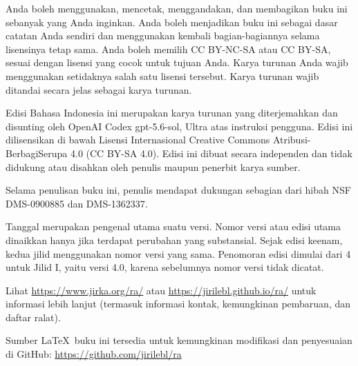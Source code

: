 \documentclass[12pt]{book}
\theoremstyle{plain}
\theoremstyle{remark}
\theoremstyle{definition}
\theoremstyle{exercise}
\theoremstyle{example}
\begin{document}
\bigskip

\noindent
Anda boleh menggunakan, mencetak, menggandakan, dan membagikan buku ini
sebanyak yang Anda inginkan. Anda boleh menjadikan buku ini sebagai dasar
catatan Anda sendiri dan menggunakan kembali bagian-bagiannya selama lisensinya
tetap sama. Anda boleh memilih CC BY-NC-SA atau CC BY-SA, sesuai dengan lisensi
yang cocok untuk tujuan Anda. Karya turunan Anda wajib menggunakan setidaknya
salah satu lisensi tersebut. Karya turunan wajib ditandai secara jelas sebagai
karya turunan.

\bigskip

\noindent
Edisi Bahasa Indonesia ini merupakan karya turunan yang diterjemahkan dan
disunting oleh OpenAI Codex gpt-5.6-sol, Ultra atas instruksi pengguna. Edisi ini dilisensikan di bawah
Lisensi Internasional Creative Commons Atribusi-BerbagiSerupa 4.0 (CC BY-SA
4.0). Edisi ini dibuat secara independen dan tidak didukung atau disahkan oleh
penulis maupun penerbit karya sumber.

\bigskip

\noindent
Selama penulisan buku ini, penulis mendapat dukungan sebagian dari hibah NSF
DMS-0900885 dan DMS-1362337.

\bigskip

\noindent
Tanggal merupakan pengenal utama suatu versi. Nomor versi atau edisi utama
dinaikkan hanya jika terdapat perubahan yang substansial. Sejak edisi keenam,
kedua jilid menggunakan nomor versi yang sama. Penomoran edisi dimulai dari 4
untuk Jilid I, yaitu versi 4.0, karena sebelumnya nomor versi tidak dicatat.

\bigskip

\noindent
Lihat \url{https://www.jirka.org/ra/} atau \url{https://jirilebl.github.io/ra/}
untuk informasi lebih lanjut (termasuk informasi kontak, kemungkinan
pembaruan, dan daftar ralat).

\bigskip

\noindent
Sumber \LaTeX\ buku ini tersedia untuk kemungkinan modifikasi dan penyesuaian
di GitHub: \url{https://github.com/jirilebl/ra}



\tableofcontents
{}

\newpage


\end{document}
